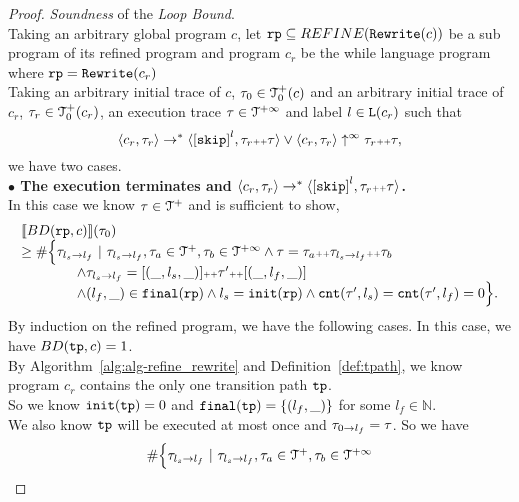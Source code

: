 \begin{proof}
\emph{Soundness} of the \emph{Loop Bound}.
  \\
  Taking an arbitrary global program $c$, let $\mathtt{rp} \subseteq REFINE(\mathtt{Rewrite}(c))$ be a sub program of its refined program and program $c_r$ be the while language program where $\mathtt{rp} = \mathtt{Rewrite}(c_r)$
  \\
Taking an arbitrary initial trace of $c$, $\mathtt{\tau}_0 \in \mathcal{T}^{+}_0(c)$ and an arbitrary initial trace of $c_r$, $\mathtt{\tau}_r \in \mathcal{T}^{+}_0(c_r)$, 
 an execution trace $\mathtt{\tau} \in \mathcal{T}^{+\infty}$ and label $l \in \mathtt{L}(c_r)$
 such that 
 \[
  \config{{c_r}, \trace_r} \to^{*} \config{\clabel{\eskip}^{l}, \trace_r \tracecat \trace} \lor \config{c_r, \trace_r} \uparrow^{\infty} \trace_r \tracecat \trace,
  \]
 we have two cases.
\\
\textbf{$\bullet$ The execution terminates and {$\config{{c_r}, \trace_r} \to^{*} \config{\clabel{\eskip}^{l}, \trace_r \tracecat \trace}$}.} 
\\
 In this case we know $\mathtt{\tau} \in \mathcal{T}^{+}$ and is sufficient to show,
 \[
  \begin{array}{l}
  \llbracket BD(\mathtt{rp}, c) \rrbracket(\mathtt{\tau}_0) 
  \\ \geq
  \# \Big\{\mathtt{\tau}_{l_s \to l_f} ~\vert~ \mathtt{\tau}_{l_s \to l_f}, \mathtt{\tau}_a \in \mathcal{T}^{+}, \mathtt{\tau}_b \in \mathcal{T}^{+\infty}
  \land \mathtt{\tau} = \mathtt{\tau}_a {\scriptscriptstyle ++} \mathtt{\tau}_{l_s \to l_f} {\scriptscriptstyle ++} \mathtt{\tau}_b
  \\ \qquad \qquad
  \land \mathtt{\tau}_{l_s \to l_f} = [(\_, l_s, \_)] {\scriptscriptstyle ++} \mathtt{\tau}' {\scriptscriptstyle ++} [(\_, l_f, \_)]
  \\ \qquad \qquad
  \land (l_{f}, \_) \in \mathtt{final}(\mathtt{rp})
  \land l_s = \mathtt{init}(\mathtt{rp})
  \land \mathtt{cnt}(\mathtt{\tau}', l_s) = \mathtt{cnt}(\mathtt{\tau}', l_f) = 0 
  \Big\}.
\end{array}
\]
By induction on the refined program, we have the following cases.
\caseL{$\rprog = \tpath$}
In this case, we have $BD(\mathtt{tp}, c) = 1$.
\\
By Algorithm~\ref{alg:alg-refine_rewrite} and Definition~\ref{def:tpath}, we know program $c_r$ contains the only one transition path $\mathtt{tp}$.
\\
So we know $\mathtt{init}(\mathtt{tp}) = 0$ and $\mathtt{final}(\mathtt{tp}) = \{ (l_f, \_) \}$ for some $l_f \in \mathbb{N}$.
\\
We also know $\mathtt{tp}$ will be executed at most once and $\mathtt{\tau}_{0 \to l_f} = \mathtt{\tau}$. So we have
\[
  \begin{array}{l}
    \# \Big\{\mathtt{\tau}_{l_s \to l_f} ~\vert~ \mathtt{\tau}_{l_s \to l_f}, \mathtt{\tau}_a \in \mathcal{T}^{+}, \mathtt{\tau}_b \in \mathcal{T}^{+\infty}

\end{array}\]
\end{proof}
